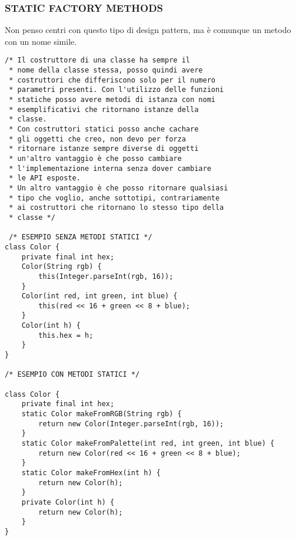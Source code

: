 \subsubsection{STATIC FACTORY METHODS}
\noindent Non penso centri con questo tipo di design pattern, ma è comunque un metodo con un nome simile.
\begin{lstlisting}
/* Il costruttore di una classe ha sempre il 
 * nome della classe stessa, posso quindi avere
 * costruttori che differiscono solo per il numero
 * parametri presenti. Con l'utilizzo delle funzioni 
 * statiche posso avere metodi di istanza con nomi 
 * esemplificativi che ritornano istanze della 
 * classe. 
 * Con costruttori statici posso anche cachare 
 * gli oggetti che creo, non devo per forza
 * ritornare istanze sempre diverse di oggetti
 * un'altro vantaggio è che posso cambiare 
 * l'implementazione interna senza dover cambiare
 * le API esposte. 
 * Un altro vantaggio è che posso ritornare qualsiasi
 * tipo che voglio, anche sottotipi, contrariamente
 * ai costruttori che ritornano lo stesso tipo della
 * classe */
 
 /* ESEMPIO SENZA METODI STATICI */
class Color {
    private final int hex;
    Color(String rgb) {
        this(Integer.parseInt(rgb, 16));
    }
    Color(int red, int green, int blue) {
        this(red << 16 + green << 8 + blue);
    }
    Color(int h) {
        this.hex = h;
    }
}

/* ESEMPIO CON METODI STATICI */

class Color {
    private final int hex;
    static Color makeFromRGB(String rgb) {
        return new Color(Integer.parseInt(rgb, 16));
    }
    static Color makeFromPalette(int red, int green, int blue) {
        return new Color(red << 16 + green << 8 + blue);
    }
    static Color makeFromHex(int h) {
        return new Color(h);
    }
    private Color(int h) {
        return new Color(h);
    }
} 

\end{lstlisting}
